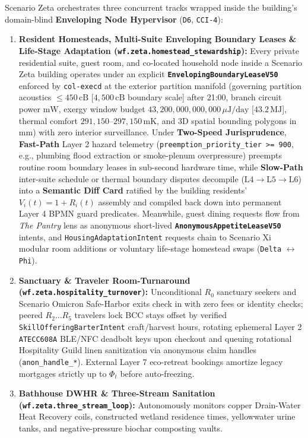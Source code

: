 Scenario Zeta orchestrates three concurrent tracks wrapped inside the building's domain-blind
\textbf{Enveloping Node Hypervisor} (\texttt{D6}, \texttt{CCI-4}):
\begin{enumerate}
    \item \textbf{Resident Homesteads, Multi-Suite Enveloping Boundary Leases \& Life-Stage Adaptation
    (\texttt{wf.zeta.homestead\_stewardship}):} Every private residential suite, guest room, and
    co-located household node inside a Scenario Zeta building operates under an explicit
    \textbf{\texttt{EnvelopingBoundaryLeaseV50}} enforced by \texttt{col-execd} at the exterior
    partition manifold (governing partition acoustics $\le 450\,\mathrm{cB}$ [$4{,}500\,\mathrm{cB}$
    boundary scale] after 21:00, branch circuit power $\mathrm{mW}$, exergy window budget
    $43{,}200{,}000{,}000{,}000\,\mu\mathrm{J/day}$ [$43.2\,\mathrm{MJ}$], thermal comfort
    $291{,}150\text{--}297{,}150\,\mathrm{mK}$, and 3D spatial bounding polygons in $\mathrm{mm}$)
    with zero interior surveillance. Under \textbf{Two-Speed Jurisprudence}, \textbf{Fast-Path}
    Layer 2 hazard telemetry (\texttt{preemption\_priority\_tier >= 900}, e.g., plumbing flood
    extraction or smoke-plenum overpressure) preempts routine room boundary leases in
    sub-second hardware time, while \textbf{Slow-Path} inter-suite schedule or thermal boundary
    disputes decompile ($\mathrm{L4} \to \mathrm{L5} \to \mathrm{L6}$) into a \textbf{Semantic
    Diff Card} ratified by the building residents' $V_i(t) = 1 + R_i(t)$ assembly and compiled
    back down into permanent Layer 4 BPMN guard predicates. Meanwhile, guest dining requests flow
    from \textit{The Pantry} lens as anonymous short-lived \textbf{\texttt{AnonymousAppetiteLeaseV50}}
    intents, and \texttt{HousingAdaptationIntent} requests chain to Scenario Xi modular room
    additions or voluntary life-stage homestead swaps (\texttt{Delta} $\leftrightarrow$
    \texttt{Phi}).
    \item \textbf{Sanctuary \& Traveler Room-Turnaround (\texttt{wf.zeta.hospitality\_turnover}):}
    Unconditional $R_0$ sanctuary seekers and Scenario Omicron Safe-Harbor exits check in
    with zero fees or identity checks; peered $R_2\dots R_5$ travelers lock BCC stays offset
    by verified \texttt{SkillOfferingBarterIntent} craft/harvest hours, rotating ephemeral
    Layer 2 \texttt{ATECC608A} BLE/NFC deadbolt keys upon checkout and queuing rotational
    Hospitality Guild linen sanitization via anonymous claim handles (\texttt{anon\_handle\_*}).
    External Layer 7 eco-retreat bookings amortize legacy mortgages strictly up to $\Phi_t$
    before auto-freezing.
    \item \textbf{Bathhouse DWHR \& Three-Stream Sanitation (\texttt{wf.zeta.three\_stream\_loop}):}
    Autonomously monitors copper Drain-Water Heat Recovery coils, constructed wetland
    residence times, yellowwater urine tanks, and negative-pressure biochar composting vaults.
\end{enumerate}

